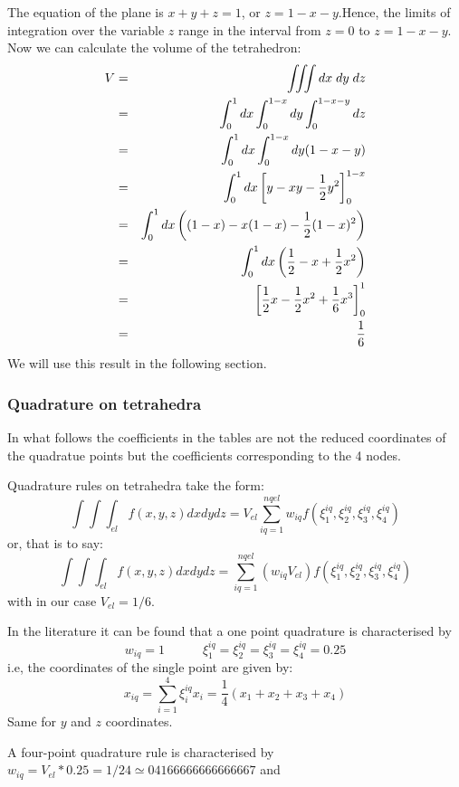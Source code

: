 

The equation of the plane is $x+y+z=1$, or $z=1-x-y$.Hence, the limits of integration over 
the variable $z$ range in the interval from
$z=0$ to $z=1-x-y$. Now we can calculate the volume of the tetrahedron:
\begin{eqnarray}
V 
&=& \iiint dx \; dy \; dz \nonumber\\
&=& \int_0^1 dx \int_0^{1-x} dy \int_{0}^{1-x-y} dz \nonumber\\
&=& \int_0^1 dx \int_0^{1-x} dy (1-x-y) \nonumber\\
&=& \int_0^1 dx \left[y-xy-\frac12 y^2 \right]_0^{1-x} \nonumber\\
&=& \int_0^1 dx \left((1-x)-x(1-x)-\frac12 (1-x)^2 \right) \nonumber\\
&=& \int_0^1 dx \left(\frac12 -x + \frac12 x^2   \right) \nonumber\\
&=& \left[ \frac12 x  -\frac12 x^2 + \frac16 x^3   \right]_0^1 \nonumber\\
&=& \frac16
\end{eqnarray}
We will use this result in the following section.

\subsubsection{Quadrature on tetrahedra}

\begin{remark}
In what follows the coefficients in the tables are not the reduced coordinates
of the quadratue points but the coefficients corresponding to the 4 nodes.
\end{remark}

Quadrature rules on tetrahedra take the form:
\[
\int\int\int_{el} f(x,y,z) dxdydz = V_{el} \sum_{iq=1}^{nqel} 
w_{iq} f(\xi^{iq}_1,\xi^{iq}_2,\xi^{iq}_3,\xi^{iq}_4) 
\]
or, that is to say:
\[
\int\int\int_{el} f(x,y,z) dxdydz = \sum_{iq=1}^{nqel} 
(w_{iq}V_{el}) f(\xi^{iq}_1,\xi^{iq}_2,\xi^{iq}_3,\xi^{iq}_4) 
\]
with in our case $V_{el}=1/6$.

In the literature it can be found that a one point quadrature is characterised by 
\[
w_{iq}=1 \quad\quad\quad \xi^{iq}_1=\xi^{iq}_2=\xi^{iq}_3=\xi^{iq}_4=0.25
\]
i.e, the coordinates of the single point are given by:
\[
x_{iq}=\sum_{i=1}^4 \xi_i^{iq} x_i = \frac{1}{4} (x_1+x_2+x_3+x_4)
\]
Same for $y$ and $z$ coordinates. 

A four-point quadrature rule is characterised by $w_{iq}=V_{el}*0.25=1/24\simeq 04166666666666667$ and 

